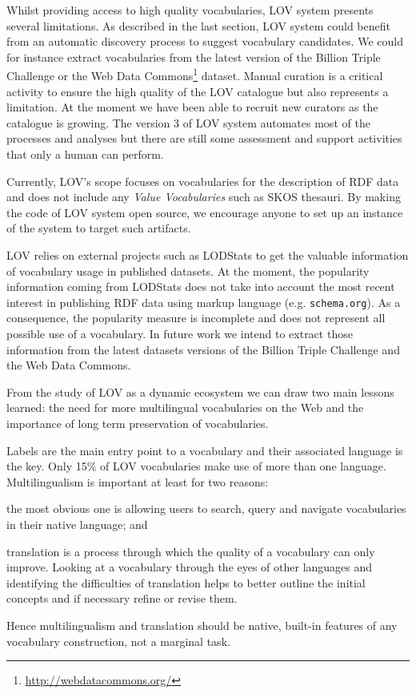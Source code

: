 \documentclass{iosart2c}
\begin{document}

Whilst providing access to high quality vocabularies, LOV system presents several limitations. As described in the last section, LOV system could benefit from an automatic discovery process to suggest vocabulary candidates. We could for instance extract vocabularies from the latest version of the Billion Triple Challenge or the Web Data Commons\footnote{\url{http://webdatacommons.org/}} dataset. Manual curation is a critical activity to ensure the high quality of the LOV catalogue but also represents a limitation. At the moment we have been able to recruit new curators as the catalogue is growing. The version 3 of LOV system automates most of the processes and analyses but there are still some assessment and support activities that only a human can perform.

Currently, LOV's scope focuses on vocabularies for the description of RDF data and does not include any \emph{Value Vocabularies} such as SKOS thesauri. By making the code of LOV system open source, we encourage anyone to set up an instance of the system to target such artifacts. 

LOV relies on external projects such as LODStats to get the valuable information of vocabulary usage in published datasets. At the moment, the popularity information coming from LODStats does not take into account the most recent interest in publishing RDF data using markup language (e.g. \texttt{schema.org}). As a consequence, the popularity measure is incomplete and does not represent all possible use of a vocabulary. In future work we intend to extract those information from the latest datasets versions of the Billion Triple Challenge and the Web Data Commons.
 

From the study of LOV as a dynamic ecosystem we can draw two main lessons learned: the need for more multilingual vocabularies on the Web and the importance of long term preservation of vocabularies. 

Labels are the main entry point to a vocabulary and their associated language is the key. Only 15\% of LOV vocabularies make use of more than one language. Multilingualism is important at least for two reasons: 
\begin{inparaenum}[1)] 
	\item the most obvious one is allowing users to search, query and navigate vocabularies in their native language; and
	\item translation is a process through which the quality of a vocabulary can only improve. Looking at a vocabulary through the eyes of other languages and identifying the difficulties of translation helps to better outline the initial concepts and if necessary refine or revise them. 
\end{inparaenum} 
Hence multilingualism and translation should be native, built-in features of any vocabulary construction, not a marginal task. 
\end{document}
